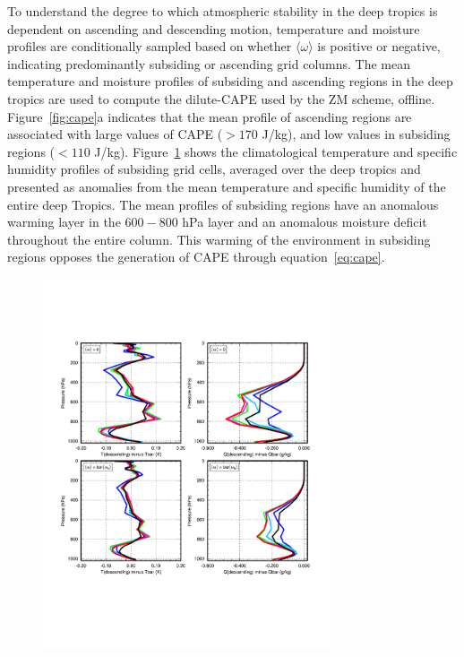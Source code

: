 \documentclass[times]{qjrms4}
\begin{document}
To understand the degree to which atmospheric stability in the deep tropics is dependent on ascending and descending motion, temperature and moisture profiles are conditionally sampled based on whether $\langle \omega \rangle$ is positive or negative, indicating predominantly subsiding or ascending grid columns. The mean temperature and moisture profiles of subsiding and ascending regions in the deep tropics are used to compute the dilute-CAPE used by the ZM scheme, offline. Figure~\ref{fig:cape}a indicates that the mean profile of ascending regions are associated with large values of CAPE ($>170$ J/kg), and low values in subsiding regions ($<110$ J/kg). Figure~\ref{fig:profiles} shows the climatological temperature and specific humidity profiles of subsiding grid cells, averaged over the deep tropics and presented as anomalies from the mean temperature and specific humidity of the entire deep Tropics. The mean profiles of subsiding regions have an anomalous warming layer in the $600-800$ hPa layer and an anomalous moisture deficit throughout the entire column. This warming of the environment in subsiding regions opposes the generation of CAPE through equation~\ref{eq:cape}.

\begin{figure}[t]
\begin{center}
\noindent\includegraphics[width=20pc,angle=0]{figs/temp_profiles.pdf}\\
\end{center}
\caption{}
\label{fig:profiles}
\end{figure}
\end{document}
